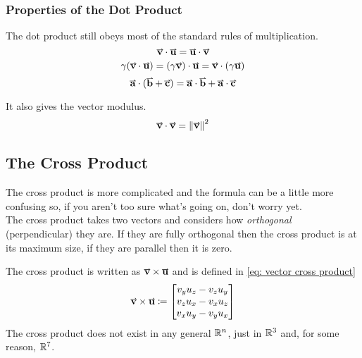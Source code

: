 \documentclass[main.tex]{subfiles}
\begin{document}
                \subsubsection{Properties of the Dot Product}
                    \label{subsubsec: Properties of the Dot Product}

                    The dot product still obeys most of the standard rules of multiplication.
                    \begin{equation}
                        \vect{v} \cdot \vect{u} = \vect{u} \cdot \vect{v}
                    \end{equation}
                    \begin{equation}
                        \gamma(\vect{v} \cdot \vect{u}) = (\gamma \vect{v}) \cdot \vect{u} = \vect{v} \cdot (\gamma\vect{u})
                    \end{equation}
                    \begin{equation}
                        \vect{a} \cdot (\vect{b} + \vect{c}) = \vect{a} \cdot \vect{b} + \vect{a} \cdot \vect{c}
                    \end{equation}

                    It also gives the vector modulus.
                    \begin{equation}
                        \vect{v} \cdot \vect{v} = \vmod{\vect{v}}^2
                    \end{equation}
            
            \newpage
            \subsection{The Cross Product}
                \label{subsubsec: The Cross Product}

                The cross product is more complicated and the formula can be a little more confusing so, if you aren't too sure what's going on, don't worry yet.\\
                The cross product takes two vectors and considers how \textit{orthogonal} (perpendicular) they are. If they are fully orthogonal then the cross product is at its maximum size, if they are parallel then it is zero.

                The cross product is written as $\vect{v} \times \vect{u}$ and is defined in \eqref{eq: vector cross product}
                \begin{equation}
                    \vect{v} \times \vect{u} \deq \Matrix{v_y u_z - v_z u_y\\ v_z u_x - v_x u_z\\ v_x u_y - v_y u_x}
                    \label{eq: vector cross product}
                \end{equation}
                The cross product does not exist in any general $\mathbb{R}^n$, just in $\mathbb{R}^3$ and, for some reason, $\mathbb{R}^7$.
\end{document}
